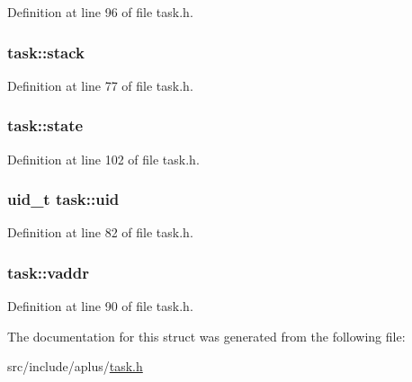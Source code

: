 Definition at line 96 of file task.\+h.

\hypertarget{structtask_a71232ebd31259f41c057b3e789b44587}{
\subsubsection[{stack}]{ task\+::stack}}\label{structtask_a71232ebd31259f41c057b3e789b44587}


Definition at line 77 of file task.\+h.

\hypertarget{structtask_a09ebd490ccb87f169fd7c3d8d95b4f39}{
\subsubsection[{state}]{ task\+::state}}\label{structtask_a09ebd490ccb87f169fd7c3d8d95b4f39}


Definition at line 102 of file task.\+h.

\hypertarget{structtask_ade8fc4c414bce856dacf9efee3031be8}{
\subsubsection[{uid}]{\setlength{\rightskip}{0pt plus 5cm}uid\+\_\+t task\+::uid}}\label{structtask_ade8fc4c414bce856dacf9efee3031be8}


Definition at line 82 of file task.\+h.

\hypertarget{structtask_a340cbedbdc4b542793e7677dd4966ade}{
\subsubsection[{vaddr}]{ task\+::vaddr}}\label{structtask_a340cbedbdc4b542793e7677dd4966ade}


Definition at line 90 of file task.\+h.



The documentation for this struct was generated from the following file\+:\begin{DoxyCompactItemize}
\item 
src/include/aplus/\hyperlink{task_8h}{task.\+h}\end{DoxyCompactItemize}

